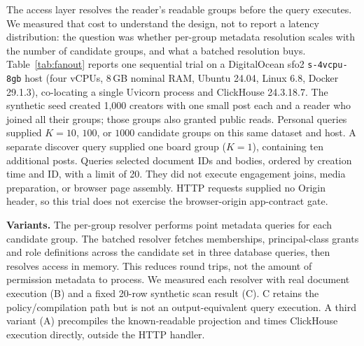 \documentclass[sigconf, nonacm]{acmart}
\begin{document}
The access layer resolves the reader's readable groups before the query
executes. We measured that cost to understand the design, not to report a
latency distribution: the question was whether per-group metadata resolution
scales with the number of candidate groups, and what a batched resolution
buys. Table~\ref{tab:fanout} reports one sequential trial on a DigitalOcean
sfo2 \texttt{s-4vcpu-8gb} host (four vCPUs, 8\,GB nominal RAM, Ubuntu 24.04,
Linux 6.8, Docker 29.1.3), co-locating a single Uvicorn process and
ClickHouse 24.3.18.7. The synthetic seed created 1,000 creators with one
small post each and a reader who joined all their groups; those groups also
granted public reads. Personal queries supplied $K=10$, $100$, or $1000$
candidate groups on this same dataset and host. A separate discover query
supplied one board group ($K=1$), containing ten additional posts. Queries
selected document IDs and bodies, ordered by creation time and ID, with a
limit of 20. They did not execute engagement joins, media preparation, or
browser page assembly. HTTP requests supplied no Origin header, so this
trial does not exercise the browser-origin app-contract gate.

\textbf{Variants.} The per-group resolver performs point metadata queries for
each candidate group. The batched resolver fetches memberships,
principal-class grants and role definitions across the candidate set in
three database queries, then resolves access in memory. This reduces round
trips, not the amount of permission metadata to process. We measured each
resolver with real document execution (B) and a fixed 20-row synthetic scan
result (C). C retains the policy/compilation path but is not an
output-equivalent query execution. A third variant (A) precompiles the
known-readable projection and times ClickHouse execution directly, outside
the HTTP handler.
\end{document}
